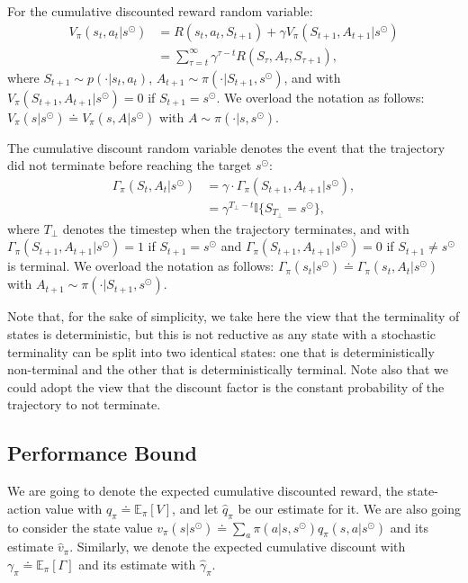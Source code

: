 For the cumulative discounted reward random variable:
\begin{align}
    V_\pi(s_t,a_t|s^{\odot}) &= R(s_t,a_t,S_{t+1})+\gamma V_\pi(S_{t+1},A_{t+1}|s^{\odot}) \\
     &= \sum_{\tau=t}^\infty \gamma^{\tau-t} R(S_\tau,A_\tau,S_{\tau+1}),
\end{align}
where $S_{t+1}\sim p(\cdot|s_t,a_t)$, $A_{t+1}\sim\pi(\cdot|S_{t+1},s^{\odot})$, and with $V_\pi(S_{t+1},A_{t+1}|s^{\odot})=0$ if $S_{t+1}=s^{\odot}$. We overload the notation as follows: $V_\pi(s|s^{\odot}) \doteq V_\pi(s,A|s^{\odot})$ with $A\sim\pi(\cdot|s,s^{\odot})$.
 
The cumulative discount random variable denotes the event that the trajectory did not terminate before reaching the target $s^{\odot}$:
\begin{align}
    \Gamma_\pi(S_t,A_t|s^{\odot}) &= \gamma\cdot\Gamma_\pi(S_{t+1},A_{t+1}|s^{\odot}), \\
     &= \gamma^{T_\perp-t} \mathbb{I}{\{S_{T_\perp}=s^{\odot}\}},
\end{align}
where $T_\perp$ denotes the timestep when the trajectory terminates, and with $\Gamma_\pi(S_{t+1},A_{t+1}|s^{\odot})=1$ if $S_{t+1}=s^{\odot}$ and $\Gamma_\pi(S_{t+1},A_{t+1}|s^{\odot})=0$ if $S_{t+1}\neq s^{\odot}$ is terminal. We overload the notation as follows: $\Gamma_\pi(s_t|s^{\odot}) \doteq \Gamma_\pi(s_t,A_t|s^{\odot})$ with $A_{t+1}\sim\pi(\cdot|S_{t+1},s^{\odot})$.

Note that, for the sake of simplicity, we take here the view that the terminality of states is deterministic, but this is not reductive as any state with a stochastic terminality can be split into two identical states: one that is deterministically non-terminal and the other that is deterministically terminal. Note also that we could adopt the view that the discount factor is the constant probability of the trajectory to not terminate. 

\subsection{Performance Bound}
\label{sec:proof_bound}
We are going to denote the expected cumulative discounted reward, \aka{} the state-action value with $q_\pi \doteq \mathbb{E}_\pi[V]$, and let $\hat{q}_\pi$ be our estimate for it. We are also going to consider the state value $v_\pi(s|s^{\odot}) \doteq \sum_a \pi(a|s,s^{\odot})q_\pi(s,a|s^{\odot})$ and its estimate $\hat{v}_\pi$. Similarly, we denote the expected cumulative discount with $\gamma_\pi\doteq \mathbb{E}_\pi[\Gamma]$ and its estimate with $\hat{\gamma}_\pi$.

